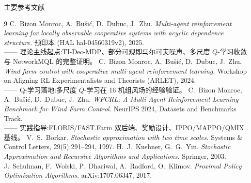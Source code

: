 \documentclass[aspectratio=169,11pt,UTF8]{ctexbeamer}
\begin{document}
\begin{frame}[allowframebreaks]{主要参考文献}
\footnotesize
\begin{thebibliography}{9}
 C.~Bizon Monroc, A.~Bu\v{s}i\'c, D.~Dubuc, J.~Zhu.
  \emph{Multi-agent reinforcement learning for locally observable cooperative systems with acyclic dependence structure.}
  预印本 (HAL hal-04560319v2), 2025.\\ {\color{mygray}—— 理论主线起点:TI-Dec-MDP、部分可观即马尔可夫噪声、多尺度 $Q$-学习收敛与 NetworkMQL 的完整证明。}
 C.~Bizon Monroc, A.~Bu\v{s}i\'c, D.~Dubuc, J.~Zhu.
  \emph{Wind farm control with cooperative multi-agent reinforcement learning.}
  Workshop on Aligning RL Experimentalists and Theorists (ARLET), 2024.\\ {\color{mygray}—— Q-学习落地:多尺度 $Q$-学习在 16 机组风场的经验验证。}
 C.~Bizon Monroc, A.~Bu\v{s}i\'c, D.~Dubuc, J.~Zhu.
  \emph{WFCRL: A Multi-Agent Reinforcement Learning Benchmark for Wind Farm Control.}
  NeurIPS 2024, Datasets and Benchmarks Track.\\ {\color{mygray}—— 实践指导:FLORIS/FAST.Farm 双后端、奖励设计、IPPO/MAPPO/QMIX 基线。}
 V.~S.~Borkar.
  \emph{Stochastic approximation with two time scales.}
  Systems \& Control Letters, 29(5):291--294, 1997.
 H.~J.~Kushner, G.~G.~Yin.
  \emph{Stochastic Approximation and Recursive Algorithms and Applications.} Springer, 2003.
 J.~Schulman, F.~Wolski, P.~Dhariwal, A.~Radford, O.~Klimov.
  \emph{Proximal Policy Optimization Algorithms.} arXiv:1707.06347, 2017.
\end{thebibliography}
\end{frame}
\end{document}
